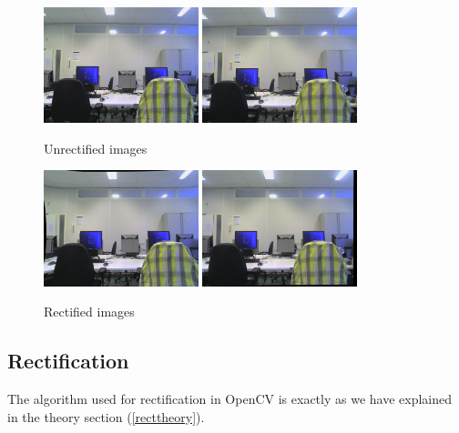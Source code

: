 \documentclass[a4paper]{article}
\begin{document}
\begin{figure}[h] \centering
  \includegraphics[width=0.4\textwidth]{leftown}
  \includegraphics[width=0.4\textwidth]{rightown}
  \caption{Unrectified images}
  \label{unrectified}

  \includegraphics[width=0.4\textwidth]{leftownr}
  \includegraphics[width=0.4\textwidth]{rightownr}
  \caption{Rectified images}
  \label{rectified}
\end{figure} \newpage

\subsection{Rectification}
The algorithm used for rectification in OpenCV is exactly as we have
explained in the theory section (\ref{recttheory}).
\end{document}
